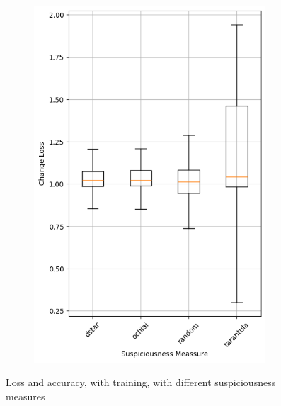 \begin{figure}
\begin{subfigure}{0.5\textwidth}
        \includegraphics[width=0.95\textwidth]{plots/Meassure_Trained_loss.png}
    \end{subfigure}
    \caption{Loss and accuracy, with training, with different suspiciousness measures}
    \label{fig:suspiciousness-measures-training}
\end{figure}
